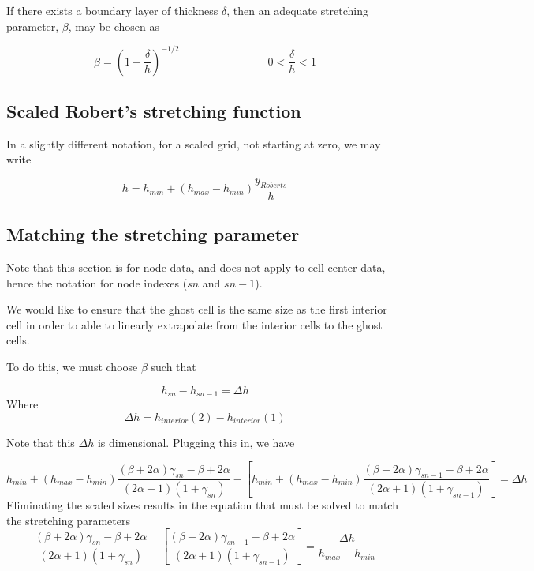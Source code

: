 \documentclass[11pt]{article}
\begin{document}
If there exists a boundary layer of thickness $\delta$, then an adequate stretching parameter, $\beta$, may be chosen as

\begin{equation}
	\beta = \left( 1 - \frac{\delta}{h} \right)^{-1/2}
	\qquad \qquad
	\qquad \qquad
	0 < \frac{\delta}{h} < 1
\end{equation}


\subsection{Scaled Robert's stretching function}
In a slightly different notation, for a scaled grid, not starting at zero, we may write

\begin{equation}
	h = h_{min} + (h_{max}-h_{min}) \frac{y_{Roberts}}{h}
\end{equation}

\subsection{Matching the stretching parameter}
Note that this section is for node data, and does not apply to cell center data, hence the notation for node indexes ($sn$ and $sn-1$).

We would like to ensure that the ghost cell is the same size as the first interior cell in order to able to linearly extrapolate from the interior cells to the ghost cells.

To do this, we must choose $\beta$ such that

\begin{equation}
	h_{sn} - h_{sn-1} = \Delta h
\end{equation}
Where
\begin{equation}
	\Delta h = h_{interior}(2) - h_{interior}(1)
\end{equation}

Note that this $\Delta h$ is dimensional. Plugging this in, we have

\begin{equation}
	h_{min} + (h_{max}-h_{min}) \frac{(\beta+2\alpha)\gamma_{sn} - \beta + 2\alpha}{(2\alpha+1)(1+\gamma_{sn})}
	-
	\left[
	h_{min} + (h_{max}-h_{min}) \frac{(\beta+2\alpha)\gamma_{sn-1} - \beta + 2\alpha}{(2\alpha+1)(1+\gamma_{sn-1})}
	\right]
	=
	\Delta h
\end{equation}
Eliminating the scaled sizes results in the equation that must be solved to match the stretching parameters
\begin{equation}
	\boxed{
	\frac{(\beta+2\alpha)\gamma_{sn} - \beta + 2\alpha}{(2\alpha+1)(1+\gamma_{sn})}
	-
	\left[
	\frac{(\beta+2\alpha)\gamma_{sn-1} - \beta + 2\alpha}{(2\alpha+1)(1+\gamma_{sn-1})}
	\right]
	=
	\frac{\Delta h}{h_{max}-h_{min}}
	}
\end{equation}
\end{document}
